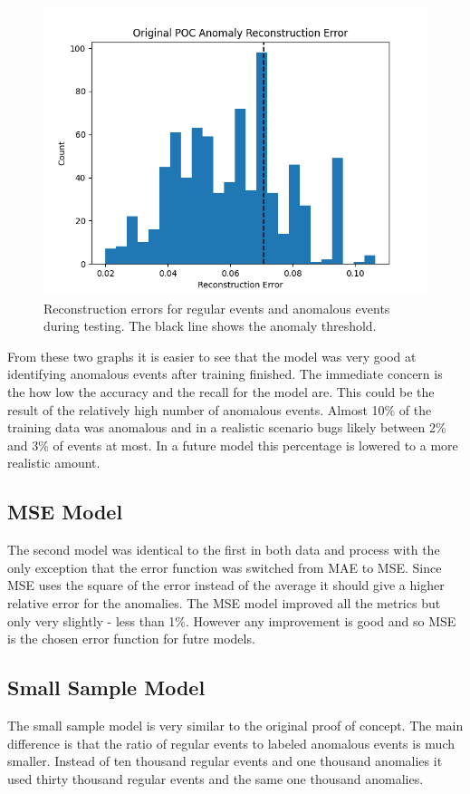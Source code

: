 \documentclass[a4paper,11pt]{article}
\begin{document}
\begin{figure}[H]
\centering
\includegraphics[width=.8\textwidth]{original_poc_anomaly_reconstruction.png}
\caption{Reconstruction errors for regular events and anomalous events during testing. The black line shows the anomaly threshold.}
\label{original_poc_anomaly}
\end{figure}
From these two graphs it is easier to see that the model was very good at identifying anomalous events after training finished. The immediate concern is the how low the accuracy and the recall for the model are. This could be the result of the relatively high number of anomalous events. Almost 10\% of the training data was anomalous and in a realistic scenario bugs likely between 2\% and 3\% of events at most. In a future model this percentage is lowered to a more realistic amount.
\subsection{MSE Model}
The second model was identical to the first in both data and process with the only exception that the error function was switched from MAE to MSE. Since MSE uses the square of the error instead of the average it should give a higher relative error for the anomalies. The MSE model improved all the metrics but only very slightly - less than 1\%. However any improvement is good and so MSE is the chosen error function for futre models.
\subsection{Small Sample Model}
The small sample model is very similar to the original proof of concept. The main difference is that the ratio of regular events to labeled anomalous events is much smaller. Instead of ten thousand regular events and one thousand anomalies it used thirty thousand regular events and the same one thousand anomalies.
                                                                                                                                

\end{document}
